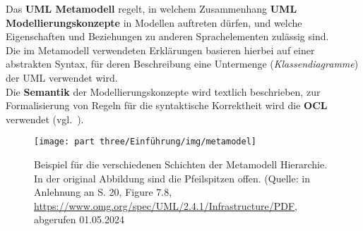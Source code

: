 \vspace{2mm}
\begin{tcolorbox}
    Das \textbf{UML Metamodell} regelt, in welchem Zusammenhang \textbf{UML Modellierungskonzepte} in Modellen auftreten dürfen, und welche Eigenschaften und Beziehungen zu anderen Sprachelementen zulässig sind.\\
    Die im Metamodell verwendeten Erklärungen basieren hierbei auf einer abstrakten Syntax, für deren Beschreibung eine Untermenge (\textit{Klassendiagramme}) der UML verwendet wird.\\
    Die \textbf{Semantik} der Modellierungskonzepte wird textlich beschrieben, zur Formalisierung von Regeln für die syntaktische Korrektheit wird die \textbf{OCL} verwendet (vgl.~\cite[82]{Buh09}).
\end{tcolorbox}
\vspace{2mm}

\begin{figure}
    \centering
    \texttt{[image: part three/Einführung/img/metamodel]}
    \caption{Beispiel für die verschiedenen Schichten der Metamodell Hierarchie.
    In der original Abbildung sind die Pfeilspitzen offen. (Quelle: in Anlehnung an S. 20, Figure 7.8, \url{https://www.omg.org/spec/UML/2.4.1/Infrastructure/PDF}, abgerufen 01.05.2024}
    \label{fig:metamodel}
\end{figure}
